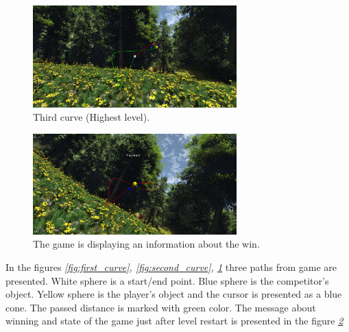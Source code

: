 \begin{figure}
\begin{center}
\includegraphics[width=0.7\textwidth]{Images/third_curve}%
\end{center}
\caption{Third curve (Highest level).}
\label{fig:third_curve}
\end{figure}

\begin{figure}
\begin{center}
\includegraphics[width=0.7\textwidth]{Images/won}%
\end{center}
\caption{The game is displaying an information about the win.}
\label{fig:win}
\end{figure}

In the figures \emph{\ref{fig:first_curve}, \ref{fig:second_curve}, \ref{fig:third_curve}} three paths from game are presented. White sphere is a start/end point. Blue sphere is the competitor's object. Yellow sphere is the player's object and the cursor is presented as a blue cone. The passed distance is marked with green color. The message about winning and state of the game just after level restart is presented in the figure \emph{\ref{fig:win}} 


